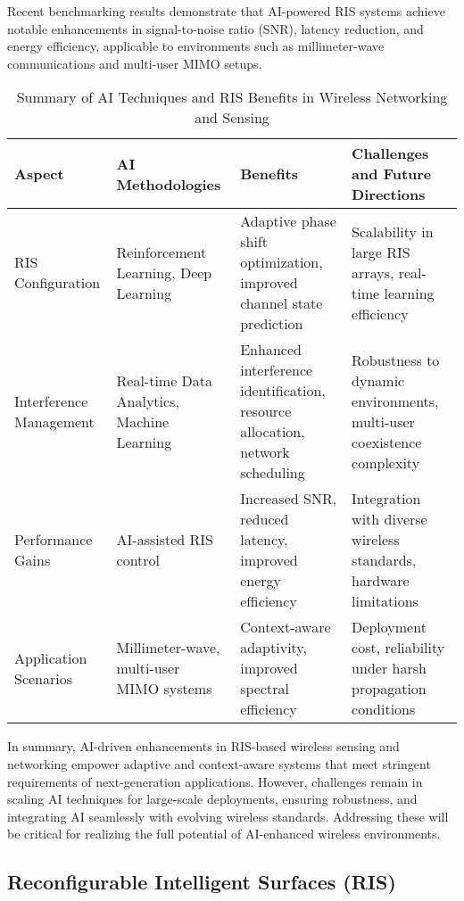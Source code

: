 \documentclass[sigconf]{acmart}
\begin{document}
Recent benchmarking results demonstrate that AI-powered RIS systems achieve notable enhancements in signal-to-noise ratio (SNR), latency reduction, and energy efficiency, applicable to environments such as millimeter-wave communications and multi-user MIMO setups.

\begin{table*}[htbp]
\centering
\caption{Summary of AI Techniques and RIS Benefits in Wireless Networking and Sensing}
\label{tab:ai_ris_summary}
\begin{adjustbox}{max width=\textwidth}
\begin{tabular}{@{}llll@{}}
\toprule
\textbf{Aspect} & \textbf{AI Methodologies} & \textbf{Benefits} & \textbf{Challenges and Future Directions} \\ \midrule
RIS Configuration & Reinforcement Learning, Deep Learning & Adaptive phase shift optimization, improved channel state prediction & Scalability in large RIS arrays, real-time learning efficiency \\
Interference Management & Real-time Data Analytics, Machine Learning & Enhanced interference identification, resource allocation, network scheduling & Robustness to dynamic environments, multi-user coexistence complexity \\
Performance Gains & AI-assisted RIS control & Increased SNR, reduced latency, improved energy efficiency & Integration with diverse wireless standards, hardware limitations \\
Application Scenarios & Millimeter-wave, multi-user MIMO systems & Context-aware adaptivity, improved spectral efficiency & Deployment cost, reliability under harsh propagation conditions \\ \bottomrule
\end{tabular}
\end{adjustbox}
\end{table*}

In summary, AI-driven enhancements in RIS-based wireless sensing and networking empower adaptive and context-aware systems that meet stringent requirements of next-generation applications. However, challenges remain in scaling AI techniques for large-scale deployments, ensuring robustness, and integrating AI seamlessly with evolving wireless standards. Addressing these will be critical for realizing the full potential of AI-enhanced wireless environments.

\subsection{Reconfigurable Intelligent Surfaces (RIS)}
\end{document}
